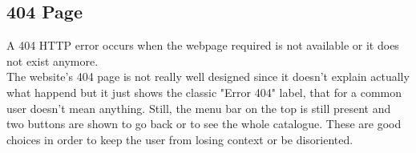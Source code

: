 \subsection{404 Page}

A 404 HTTP error occurs when the webpage required is not available or it does not exist anymore. \\
The website's 404 page is not really well designed since it doesn't explain actually what happend but it just shows the
classic "Error 404" label, that for a common user doesn't mean anything.
Still, the menu bar on the top is still present and two buttons are shown to go back or to see the whole catalogue.
These are good choices in order to keep the user from losing context or be disoriented.

